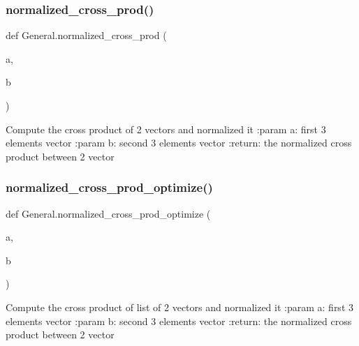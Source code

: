 \subsubsection{\texorpdfstring{normalized\+\_\+cross\+\_\+prod()}{normalized\_cross\_prod()}}
{\footnotesize\ttfamily def General.\+normalized\+\_\+cross\+\_\+prod (\begin{DoxyParamCaption}\item[{}]{a,  }\item[{}]{b }\end{DoxyParamCaption})}

\begin{DoxyVerb}Compute the cross product of 2 vectors and normalized it
:param a: first 3 elements vector
:param b: second 3 elements vector
:return: the normalized cross product between 2 vector
\end{DoxyVerb}
 \mbox{\label{namespace_general_adfadd7bf376e5e61f7ff3814f92dea05}} 
\subsubsection{\texorpdfstring{normalized\+\_\+cross\+\_\+prod\+\_\+optimize()}{normalized\_cross\_prod\_optimize()}}
{\footnotesize\ttfamily def General.\+normalized\+\_\+cross\+\_\+prod\+\_\+optimize (\begin{DoxyParamCaption}\item[{}]{a,  }\item[{}]{b }\end{DoxyParamCaption})}

\begin{DoxyVerb}Compute the cross product of list of 2 vectors and normalized it
:param a: first 3 elements vector
:param b: second 3 elements vector
:return: the normalized cross product between 2 vector
\end{DoxyVerb}
 